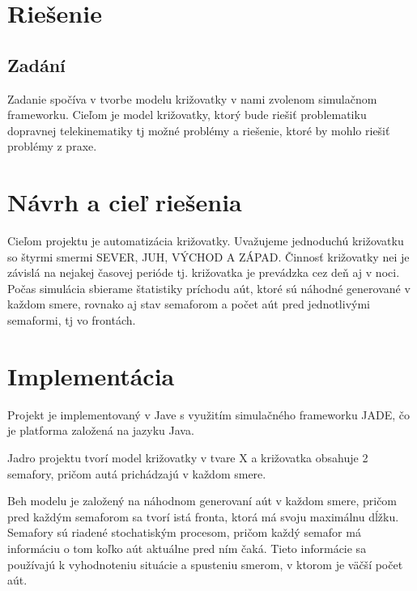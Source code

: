 \documentclass[12pt,a4paper,titlepage,final]{article}
\begin{document}

\def\author{Martin Maga}
\def\email{xmagam00@stud.fit.vutbr.cz}
\def\projname{Riešenie \\Projekt z predmetu SIN \\  \Large{Zadanie: Dopravní telematika} }


\tableofcontents
\newpage

\section{Riešenie}

\subsection{Zadání}
Zadanie spočíva v tvorbe modelu križovatky v nami zvolenom simulačnom frameworku. Cieľom je model križovatky, ktorý bude riešiť problematiku dopravnej telekinematiky tj možné problémy a riešenie, ktoré by mohlo riešiť problémy z praxe.

\section{Návrh a cieľ riešenia}
Cieľom projektu je automatizácia križovatky. Uvažujeme jednoduchú križovatku so štyrmi smermi SEVER, JUH, VÝCHOD A ZÁPAD. Činnosť križovatky nei je závislá na nejakej časovej perióde tj. križovatka je prevádzka cez deň aj v noci. Počas simulácia sbierame štatistiky príchodu aút, ktoré sú náhodné generované v každom smere, rovnako aj stav semaforom a počet aút pred jednotlivými semaformi, tj vo frontách.

\section{Implementácia}
Projekt je implementovaný v Jave s využitím simulačného frameworku JADE, čo je platforma založená na jazyku Java.

Jadro projektu tvorí model križovatky v tvare X a križovatka obsahuje 2 semafory, pričom autá prichádzajú v každom smere.

Beh modelu je založený na náhodnom generovaní aút v každom smere, pričom pred každým semaforom sa tvorí istá fronta, ktorá má svoju maximálnu dĺžku. Semafory sú riadené stochatiským procesom, pričom každý semafor má informáciu o tom koľko aút aktuálne pred ním čaká. Tieto informácie sa používajú k vyhodnoteniu situácie a spusteniu smerom, v ktorom je väčší počet aút. 
\end{document}

